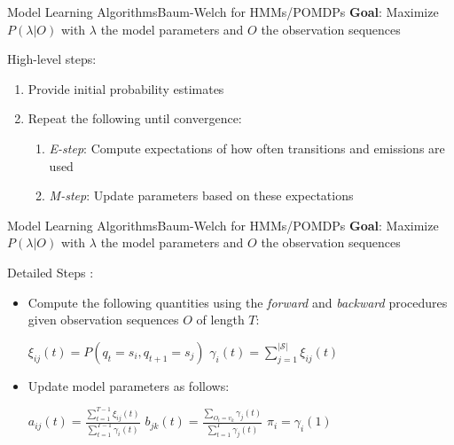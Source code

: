 \begin{frame}{Model Learning Algorithms}{Baum-Welch for HMMs/POMDPs}
	\textbf{Goal}: Maximize $P(\lambda \vert O)$ with $\lambda$ the model parameters and $O$ the observation sequences
	\vspace{10pt}
	
	High-level steps:
	\begin{enumerate}
		\item Provide initial probability estimates
		\item Repeat the following until convergence:
		\begin{enumerate}
			\item \textit{E-step}: Compute expectations of how often transitions and emissions are used
			\item \textit{M-step}: Update parameters based on these expectations
		\end{enumerate}
	\end{enumerate}
\end{frame}

\begin{frame}{Model Learning Algorithms}{Baum-Welch for HMMs/POMDPs}
	\textbf{Goal}: Maximize $P(\lambda \vert O)$ with $\lambda$ the model parameters and $O$ the observation sequences
	\vspace{10pt}
	
	Detailed Steps \cite{welch2003hidden}:
	\begin{itemize}
		\item Compute the following quantities using the \textit{forward} and \textit{backward} procedures given observation sequences $O$ of length $T$:
		\begin{center}
			\begin{multicols}{2}
				$\xi_{ij}(t) = P(q_t = s_i, q_{t+1} = s_j)$
				\hspace{20pt}
				$\gamma_i(t) = \sum_{j=1}^{|\mathcal{S}|} \xi_{ij}(t)$
			\end{multicols}
		\end{center}
		

		\item Update model parameters as follows:
		\begin{center}
			\begin{multicols}{3}
				$a_{ij}(t) = \frac{\sum_{t=1}^{T-1} \xi_{ij}(t)}{\sum_{t=1}^{T-1} \gamma_{i}(t)}$
				\hspace{20pt}
				$b_{jk}(t) = \frac{\sum_{O_t = v_k} \gamma_j(t)}{\sum_{t=1}^{T} \gamma_j(t)}$
				\hspace{20pt}
				$\pi_i = \gamma_i(1)$
			\end{multicols}
		\end{center}
		
	\end{itemize}
\end{frame}

